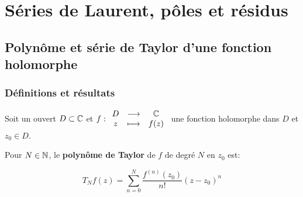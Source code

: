 \chapter{Séries de Laurent, pôles et résidus}


\section{Polynôme et série de Taylor d'une fonction holomorphe}

\subsection{Définitions et résultats}

\begin{hypothesis}
    Soit un ouvert $D \subset \mathbb{C}$ et $f: \begin{array}{ccc}
    D & \longrightarrow & \mathbb{C}\\
    z & \longmapsto & f(z)
    \end{array}$ une fonction holomorphe dans $D$ et $z_0 \in D$.
\end{hypothesis}

\begin{definition}
    Pour $N \in \mathbb{N}$, le \textbf{polynôme de Taylor} de $f$ de degré $N$ en $z_0$ est:
    
    \[
    T_N f(z) = \sum_{n = 0}^N \frac{f^{(n)}(z_0)}{n!}(z - z_0)^n
    \]
\end{definition}

